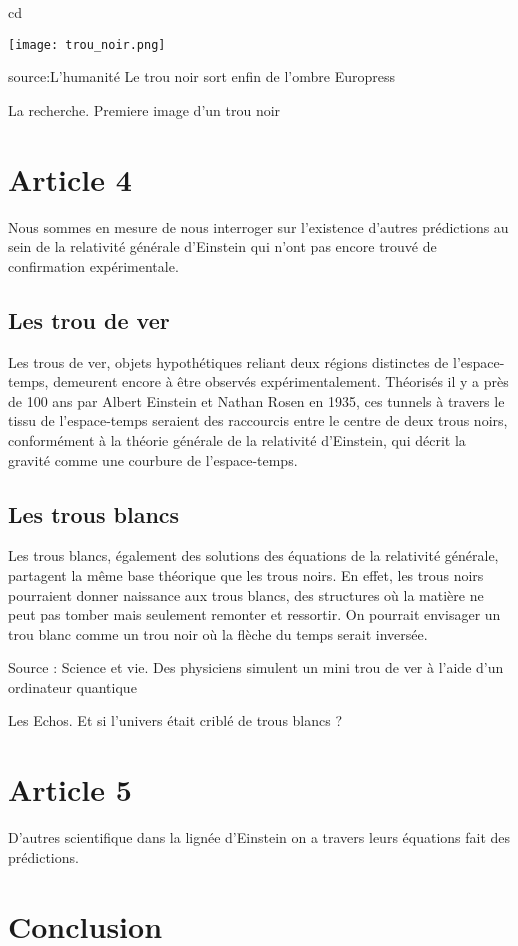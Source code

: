 cd\documentclass{article}
\begin{document}
\texttt{[image: trou\_noir.png]}

source:L'humanité Le trou noir sort enfin de l'ombre
Europress

La recherche. Premiere image d'un trou noir



\label{sec:article3} 

\section{Article 4} %

Nous sommes en mesure de nous interroger sur l'existence d'autres prédictions au sein de la relativité générale d'Einstein qui n'ont pas encore trouvé de confirmation expérimentale.
\subsection{Les trou de ver}
Les trous de ver, objets hypothétiques reliant deux régions distinctes de l'espace-temps, demeurent encore à être observés expérimentalement. Théorisés il y a près de 100 ans par Albert Einstein et Nathan Rosen en 1935, ces tunnels à travers le tissu de l'espace-temps seraient des raccourcis entre le centre de deux trous noirs, conformément à la théorie générale de la relativité d'Einstein, qui décrit la gravité comme une courbure de l'espace-temps. 
\subsection{Les trous blancs}
Les trous blancs, également des solutions des équations de la relativité générale, partagent la même base théorique que les trous noirs. En effet, les trous noirs pourraient donner naissance aux trous blancs, des structures où la matière ne peut pas tomber mais seulement remonter et ressortir. On pourrait envisager un trou blanc comme un trou noir où la flèche du temps serait inversée.



Source : Science et vie. Des physiciens simulent un mini trou de ver à l’aide d’un ordinateur quantique

Les Echos. Et si l'univers était criblé de trous blancs ?

\label{sec:article4} 

\section{Article 5}

D'autres scientifique dans la lignée d'Einstein on a travers leurs équations fait des prédictions. 


\section{Conclusion}
\end{document}
